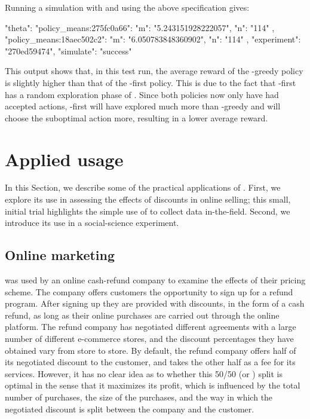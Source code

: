 \documentclass[nojss]{jss}
\begin{document}
Running a simulation with  and  using the above specification gives:
\begin{Code}
{
    "theta": {
        "policy_means:275fc0a66": {
            "m": "5.243151928222057",
            "n": "114"
        },
        "policy_means:18aec502c2": {
            "m": "6.050783848360902",
            "n": "114"
        }
    },
    "experiment": "270ed59474",
    "simulate": "success"
}
\end{Code}
This output shows that, in this test run, the average reward of the -greedy policy is slightly higher than that of the -first policy. This is due to the fact that -first has a random exploration phase of . Since both policies now only have had  accepted actions, -first will have explored much more than -greedy and will choose the suboptimal action more, resulting in a lower average reward.



\section{Applied usage}
\label{sec:practice}

In this Section, we describe some of the practical applications of . First, we explore its use in assessing the effects of discounts in online selling; this small, initial trial highlights the simple use of  to collect data in-the-field. Second, we introduce its use in a social-science experiment.

\subsection{Online marketing}

 was used by an online cash-refund company to examine the effects of their pricing scheme. The company offers customers the opportunity to sign up for a refund program. After signing up they are provided with discounts, in the form of a cash refund, as long as their online purchases are carried out through the online platform. The refund company has negotiated different agreements with a large number of different e-commerce stores, and the discount percentages they have obtained vary from store to store. By default, the refund company offers half of its negotiated discount to the customer, and takes the other half as a fee for its services. However, it has no clear idea as to whether this 50/50 (or ) split is optimal in the sense that it maximizes its profit, which is influenced by the total number of purchases, the size of the purchases, and the way in which the negotiated discount is split between the company and the customer.
\end{document}
